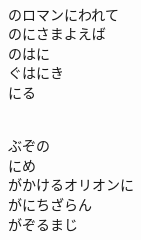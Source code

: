 \documentclass[10pt,b5j]{tarticle} %
\begin{document}
\begin{enumerate}
\begin{minipage}[c]{\blocksize}
        \vspace{\linespace}
        \item~\\
        のロマンにわれて\\
        のにさまよえば\\
        のはに\\
        ぐはにき\\
        にる
        
    \end{minipage}
    \begin{minipage}[c]{\blocksize}
        
        \vspace{\linespace}
        \item~\\
        ぶぞの\\
        にめ\\
        がかけるオリオンに\\
        がにちざらん\\
        がぞるまじ
    
    \end{minipage}
\end{enumerate} %
\end{document}
